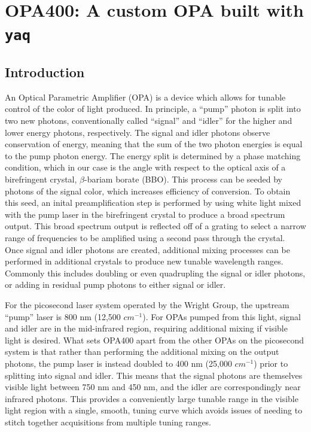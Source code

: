 \chapter{OPA400: A custom OPA built with \texttt{yaq}} \label{cha:opa400}

\clearpage

\section{Introduction}  %

An Optical Parametric Amplifier (OPA) is a device which allows for tunable control of the color of light produced.
In principle, a ``pump'' photon is split into two new photons, conventionally called ``signal'' and ``idler'' for the higher and lower energy photons, respectively.
The signal and idler photons observe conservation of energy, meaning that the sum of the two photon energies is equal to the pump photon energy.
The energy split is determined by a phase matching condition, which in our case is the angle with respect to the optical axis of a birefringent crystal, $\beta$-bariam borate (BBO).
This process can be seeded by photons of the signal color, which increases efficiency of conversion.
To obtain this seed, an inital preamplification step is performed by using white light mixed with the pump laser in the birefringent crystal to produce a broad spectrum output.
This broad spectrum output is reflected off of a grating to select a narrow range of frequencies to be amplified using a second pass through the crystal.
Once signal and idler photons are created, additional mixing processes can be performed in additional crystals to produce new tunable wavelength ranges.
Commonly this includes doubling or even quadrupling the signal or idler photons, or adding in residual pump photons to either signal or idler.

For the picosecond laser system operated by the Wright Group, the upstream ``pump'' laser is 800 nm (12,500 $cm^{-1}$).
For OPAs pumped from this light, signal and idler are in the mid-infrared region, requiring additional mixing if visible light is desired.
What sets OPA400 apart from the other OPAs on the picosecond system is that rather than performing the additional mixing on the output photons, the pump laser is instead doubled to 400 nm (25,000 $cm^{-1}$) prior to splitting into signal and idler.
This means that the signal photons are themselves visible light between 750 nm and 450 nm, and the idler are correspondingly near infrared photons.
This provides a conveniently large tunable range in the visible light region with a single, smooth, tuning curve which avoids issues of needing to stitch together acquisitions from multiple tuning ranges.

